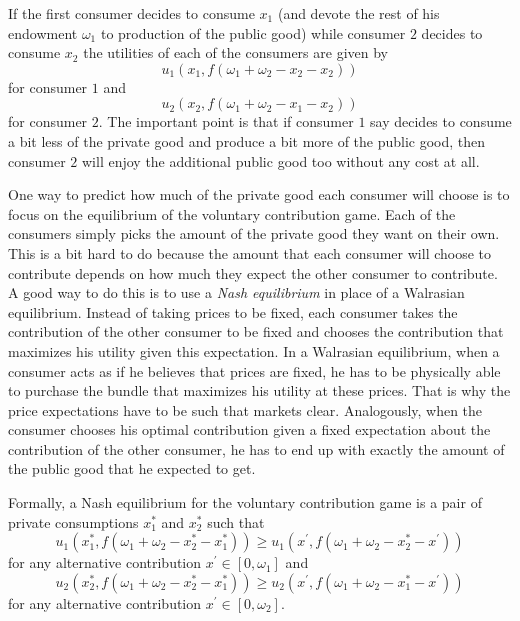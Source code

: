\documentclass{article}
\begin{document}
If the first consumer decides to consume $x_{1}$ (and devote the rest of his
endowment $\omega_{1}$ to production of the public good) while consumer $2$
decides to consume $x_{2}$ the utilities of each of the consumers are given by%
\[
u_{1}\left(  x_{1},f\left(  \omega_{1}+\omega_{2}-x_{2}-x_{2}\right)
\right)
\]
for consumer $1$ and%
\[
u_{2}\left(  x_{2},f\left(  \omega_{1}+\omega_{2}-x_{1}-x_{2}\right)
\right)
\]
for consumer $2$. The important point is that if consumer $1$ say decides to
consume a bit less of the private good and produce a bit more of the public
good, then consumer $2$ will enjoy the additional public good too without any
cost at all.

One way to predict how much of the private good each consumer will choose is
to focus on the equilibrium of the voluntary contribution game. Each of the
consumers simply picks the amount of the private good they want on their own.
This is a bit hard to do because the amount that each consumer will choose to
contribute depends on how much they expect the other consumer to contribute. A
good way to do this is to use a \emph{Nash equilibrium} in place of a
Walrasian equilibrium. Instead of taking prices to be fixed, each consumer
takes the contribution of the other consumer to be fixed and chooses the
contribution that maximizes his utility given this expectation. In a Walrasian
equilibrium, when a consumer acts as if he believes that prices are fixed, he
has to be physically able to purchase the bundle that maximizes his utility at
these prices. That is why the price expectations have to be such that markets
clear. Analogously, when the consumer chooses his optimal contribution given a
fixed expectation about the contribution of the other consumer, he has to end
up with exactly the amount of the public good that he expected to get.

Formally, a Nash equilibrium for the voluntary contribution game is a pair of
private consumptions $x_{1}^{\ast}$ and $x_{2}^{\ast}$ such that%
\[
u_{1}\left(  x_{1}^{\ast},f\left(  \omega_{1}+\omega_{2}-x_{2}^{\ast}%
-x_{1}^{\ast}\right)  \right)  \geq u_{1}\left(  x^{\prime},f\left(
\omega_{1}+\omega_{2}-x_{2}^{\ast}-x^{\prime}\right)  \right)
\]
for any alternative contribution $x^{\prime}\in\left[  0,\omega_{1}\right]  $
and%
\[
u_{2}\left(  x_{2}^{\ast},f\left(  \omega_{1}+\omega_{2}-x_{2}^{\ast}%
-x_{1}^{\ast}\right)  \right)  \geq u_{2}\left(  x^{\prime},f\left(
\omega_{1}+\omega_{2}-x_{1}^{\ast}-x^{\prime}\right)  \right)
\]
for any alternative contribution $x^{\prime}\in\left[  0,\omega_{2}\right]  $.
\end{document}
